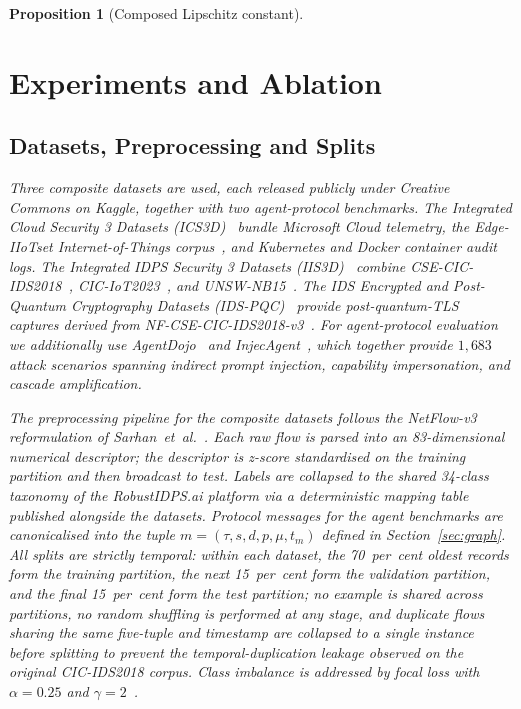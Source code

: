 \documentclass{ieeeaccess}
\newtheorem{proposition}[theorem]{Proposition}
\begin{document}
\begin{proposition}[Composed Lipschitz constant]
\section{Experiments and Ablation}
\label{sec:experiments}

\subsection{Datasets, Preprocessing and Splits}
\label{sec:datasets}
Three composite datasets are used, each released publicly under Creative Commons on Kaggle, together with two agent-protocol benchmarks. The Integrated Cloud Security 3 Datasets (ICS3D)~\cite{Anonymous2025ICS3D} bundle Microsoft Cloud telemetry, the Edge-IIoTset Internet-of-Things corpus~\cite{Ferrag2022EdgeIIoT}, and Kubernetes and Docker container audit logs. The Integrated IDPS Security 3 Datasets (IIS3D)~\cite{Anonymous2025IIS3D} combine CSE-CIC-IDS2018~\cite{Sharafaldin2018CICIDS}, CIC-IoT2023~\cite{Neto2023CICIoT}, and UNSW-NB15~\cite{Moustafa2015UNSW}. The IDS Encrypted and Post-Quantum Cryptography Datasets (IDS-PQC)~\cite{Anonymous2025PQC} provide post-quantum-TLS captures derived from NF-CSE-CIC-IDS2018-v3~\cite{Sarhan2021NetFlow}. For agent-protocol evaluation we additionally use AgentDojo~\cite{Debenedetti2024AgentDojo} and InjecAgent~\cite{Zhan2024InjecAgent}, which together provide $1{,}683$ attack scenarios spanning indirect prompt injection, capability impersonation, and cascade amplification.

The preprocessing pipeline for the composite datasets follows the NetFlow-v3 reformulation of Sarhan~\textit{et~al.}~\cite{Sarhan2021NetFlow}. Each raw flow is parsed into an 83-dimensional numerical descriptor; the descriptor is z-score standardised on the training partition and then broadcast to test. Labels are collapsed to the shared 34-class taxonomy of the RobustIDPS.ai platform via a deterministic mapping table published alongside the datasets. Protocol messages for the agent benchmarks are canonicalised into the tuple $m=(\tau,s,d,p,\mu,t_{m})$ defined in Section~\ref{sec:graph}. All splits are strictly temporal: within each dataset, the 70~per~cent oldest records form the training partition, the next 15~per~cent form the validation partition, and the final 15~per~cent form the test partition; no example is shared across partitions, no random shuffling is performed at any stage, and duplicate flows sharing the same five-tuple and timestamp are collapsed to a single instance before splitting to prevent the temporal-duplication leakage observed on the original CIC-IDS2018 corpus. Class imbalance is addressed by focal loss with $\alpha=0.25$ and $\gamma=2$~\cite{Lin2017Focal}.


\end{proposition}
\end{document}
